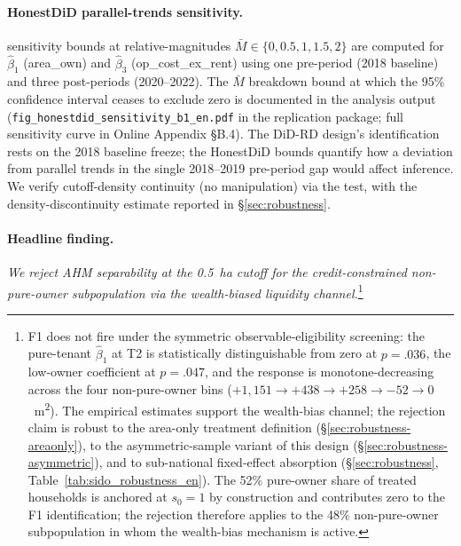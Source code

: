 \documentclass[12pt, a4paper]{article}
\begin{document}


\paragraph{HonestDiD parallel-trends sensitivity.} \citet{RambachanRoth2023_honestdid} sensitivity bounds at relative-magnitudes $\bar M \in \{0, 0.5, 1, 1.5, 2\}$ are computed for $\hat\beta_1$ (area\_own) and $\hat\beta_3$ (op\_cost\_ex\_rent) using one pre-period (2018 baseline) and three post-periods (2020--2022). The $\bar M$ breakdown bound at which the 95\% confidence interval ceases to exclude zero is documented in the analysis output (\texttt{fig\_honestdid\_sensitivity\_b1\_en.pdf} in the replication package; full sensitivity curve in Online Appendix \S B.4). The DiD-RD design's identification rests on the 2018 baseline freeze; the HonestDiD bounds quantify how a deviation from parallel trends in the single 2018--2019 pre-period gap would affect inference. We verify cutoff-density continuity (no manipulation) via the \citet{McCrary2008_density} test, with the density-discontinuity estimate reported in \S\ref{sec:robustness}.

\paragraph{Headline finding.} \textit{We reject AHM separability at the 0.5~ha cutoff for the credit-constrained non-pure-owner subpopulation via the wealth-biased liquidity channel.}\footnote{F1 does not fire under the symmetric observable-eligibility screening: the pure-tenant $\hat\beta_1$ at T2 is statistically distinguishable from zero at $p = .036$, the low-owner coefficient at $p = .047$, and the response is monotone-decreasing across the four non-pure-owner bins ($+1{,}151 \to +438 \to +258 \to -52 \to 0$~m\textsuperscript{2}). The empirical estimates support the wealth-bias channel; the rejection claim is robust to the area-only treatment definition (\S\ref{sec:robustness-areaonly}), to the asymmetric-sample variant of this design (\S\ref{sec:robustness-asymmetric}), and to sub-national fixed-effect absorption (\S\ref{sec:robustness}, Table~\ref{tab:sido_robustness_en}). The 52\% pure-owner share of treated households is anchored at $s_0 = 1$ by construction and contributes zero to the F1 identification; the rejection therefore applies to the 48\% non-pure-owner subpopulation in whom the wealth-bias mechanism is active.}
\end{document}
